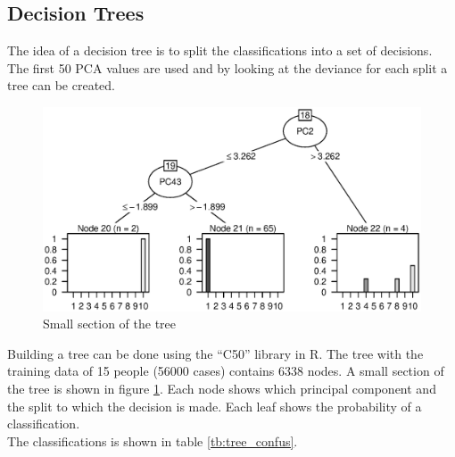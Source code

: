 \subsection{Decision Trees}

The idea of a decision tree is to split the classifications into a set of decisions.
The first 50 PCA values are used and by looking at the deviance for each split a tree can be created.

\begin{figure}[h]
\includegraphics[width = \textwidth]{graphics/tree_section}
\caption{Small section of the tree}
\label{fig:tree_section}
\end{figure}

Building a tree can be done using the ``C50'' library in R.
The tree with the training data of 15 people (56000 cases) contains 6338 nodes.
A small section of the tree is shown in figure \ref{fig:tree_section}.
Each node shows which principal component and the split to which the decision is made.
Each leaf shows the probability of a classification.\\
The classifications is shown in table \ref{tb:tree_confus}.


